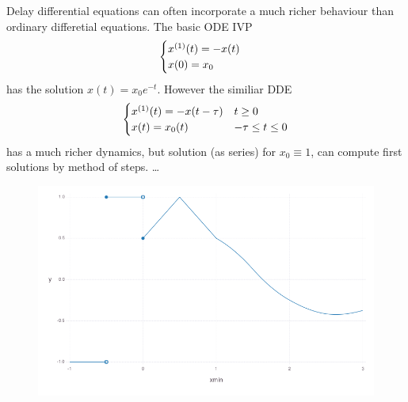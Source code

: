 \begin{example}
    Delay differential equations can often incorporate a much richer behaviour than ordinary differetial equations.
    The basic ODE IVP
    \begin{equation}
        \begin{cases}
            \D{x}(t) = -x(t)\\
            x(0) = x_0
        \end{cases}
    \end{equation}
    has the solution $x(t)=x_0 e^{-t}$. However the similiar DDE
    \begin{equation}
        \begin{cases}
            \D{x}(t) = -x(t-\tau) & t\geq 0\\
            x(t) = x_0(t) & -\tau\leq t\leq 0
        \end{cases}
    \end{equation}
    has a much richer dynamics, but solution (as series) for $x_0\equiv 1$, can compute first solutions by method of steps. \ldots{}    
\end{example}


\begin{figure}[h]\centering
    \includegraphics[width=\textwidth]{figures/piecewise-initial-function.png}
	\label{Piecewise continuous initial function.}
\end{figure}

